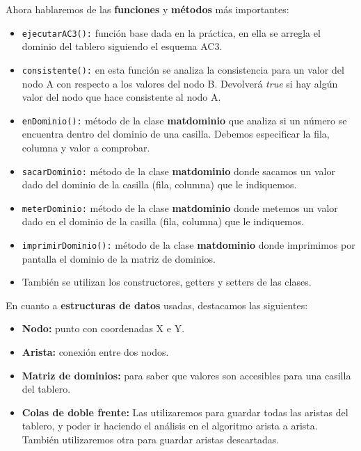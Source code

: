 \documentclass[12pt]{article}
\begin{document}
Ahora hablaremos de las \textbf{funciones} y \textbf{métodos} más importantes:

\begin{itemize}
    \item \verb|ejecutarAC3():| función base dada en la práctica, en ella se arregla el dominio
        del tablero siguiendo el esquema AC3.
    \item \verb|consistente():| en esta función se analiza la consistencia para un valor del nodo A
    con respecto a los valores del nodo B. Devolverá \textit{true} si hay algún valor del nodo que hace consistente al nodo A.
    
    \item \verb|enDominio():| método de la clase \textbf{matdominio} que analiza si un número se encuentra dentro del dominio
    de una casilla. Debemos especificar la fila, columna y valor a comprobar.

    \item \verb|sacarDominio:| método de la clase \textbf{matdominio} donde sacamos un valor dado del dominio de 
    la casilla (fila, columna) que le indiquemos.
    \item \verb|meterDominio:| método de la clase \textbf{matdominio} donde metemos un valor dado en el dominio de 
    la casilla (fila, columna) que le indiquemos.

    \item \verb|imprimirDominio():| método de la clase \textbf{matdominio} donde imprimimos por pantalla el dominio de la matriz de 
    dominios.
    
    \item También se utilizan los constructores, getters y setters de las clases.

\end{itemize}

En cuanto a \textbf{estructuras de datos} usadas, destacamos las siguientes:

\begin{itemize}
    \item \textbf{Nodo:} punto con coordenadas X e Y. 
    \item \textbf{Arista:} conexión entre dos nodos.
    
    \item \textbf{Matriz de dominios:} para saber que valores son accesibles para una casilla del tablero.
    \item \textbf{Colas de doble frente:} Las utilizaremos para guardar todas las aristas del tablero, y poder 
        ir haciendo el análisis en el algoritmo arista a arista. También utilizaremos otra para guardar aristas descartadas.
\end{itemize}
\end{document}
